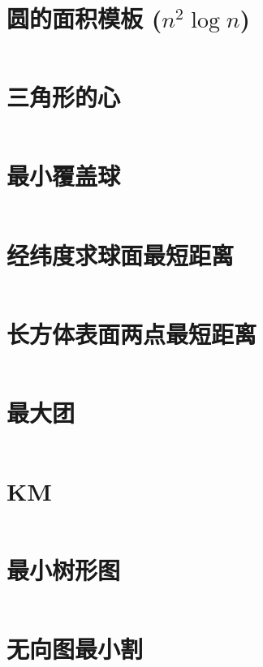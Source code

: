 \documentclass[titlepage,landscape,a4paper,10pt]{article}
\begin{document}
\begin{multicols}{2}
\begin{spacing}{0.8}
\section{圆的面积模板 ($n^2\log n$)}
\inputminted{cpp}{merge/CircleArea.cpp}

\section{三角形的心}
\inputminted{cpp}{improve/Triangle.cpp}

\section{最小覆盖球}
\inputminted{cpp}{src/最小覆盖球.cpp}

\section{经纬度求球面最短距离}
\inputminted{cpp}{src/经纬度求球面最短距离.cpp}

\section{长方体表面两点最短距离}
\inputminted{cpp}{src/长方体表面两点最短距离.cpp}

\section{最大团}
\inputminted{cpp}{improve/MaximumClique.cpp}


\section{KM}
\inputminted{cpp}{improve/Hungarian.cpp}

\section{最小树形图}
\inputminted{cpp}{improve/LiuZhu.cpp}

\section{无向图最小割}
\inputminted{cpp}{src/无向图最小割.cpp}


\end{spacing}
\end{multicols}
\end{document}
